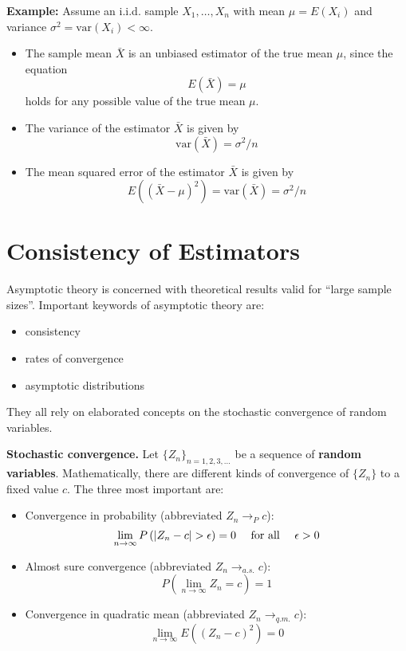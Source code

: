 \documentclass[
]{book}
\providecommand{\tightlist}{%
  \setlength{\itemsep}{0pt}\setlength{\parskip}{0pt}}
\begin{document}
\hfill\break

\textbf{Example:} Assume an i.i.d. sample \(X_1,\dots,X_n\) with mean \(\mu=E(X_i)\) and variance \(\sigma^2=\textrm{var}(X_i)<\infty\).

\begin{itemize}
\tightlist
\item
  The sample mean \(\bar X\) is an unbiased estimator of the true mean \(\mu\), since the equation
  \[E(\bar X)=\mu\]
  holds for any possible value of the true mean \(\mu\).
\item
  The variance of the estimator \(\bar X\) is given by
  \[\textrm{var}(\bar X)=\sigma^2/n\]
\item
  The mean squared error of the estimator \(\bar X\) is given by
  \[E\left((\bar X-\mu)^2\right)=\textrm{var}(\bar X)=\sigma^2/n\]
\end{itemize}

\hypertarget{consistency-of-estimators}{%
\section{Consistency of Estimators}\label{consistency-of-estimators}}

Asymptotic theory is concerned with theoretical results valid for ``large sample sizes''. Important keywords of asymptotic theory are:

\begin{itemize}
\tightlist
\item
  consistency
\item
  rates of convergence
\item
  asymptotic distributions
\end{itemize}

They all rely on elaborated concepts on the stochastic convergence of random variables.

\hfill\break

\textbf{Stochastic convergence.}
Let \(\{Z_n\}_{n=1,2,3,\dots}\) be a sequence of \textbf{random variables}. Mathematically, there are different kinds of convergence of
\(\{Z_n\}\) to a fixed value \(c\). The three most important are:

\begin{itemize}
\tightlist
\item
  Convergence in probability (abbreviated \(Z_n\to_P c\)):
  \[\lim_{n\to\infty} P\left(|Z_n-c|>\epsilon\right)=0\quad\hbox{ for all }\quad\epsilon>0\]
\item
  Almost sure convergence (abbreviated \(Z_n\to_{a.s.} c\)):
  \[P\left(\lim_{n\to\infty} Z_n=c\right)=1\]
\item
  Convergence in quadratic mean (abbreviated \(Z_n\to_{q.m.} c\)):
  \[\lim_{n\to\infty} E\left((Z_n-c)^2\right)=0\]
\end{itemize}
\end{document}
